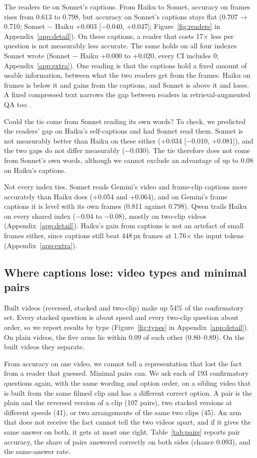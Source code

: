 \documentclass[11pt]{article}
\begin{document}
The readers tie on Sonnet's captions. From Haiku to Sonnet, accuracy on frames rises from 0.613 to 0.798, but accuracy on Sonnet's captions stays flat (0.707 → 0.710; Sonnet − Haiku +0.003 [−0.040, +0.047]; Figure~\ref{fig:readers} in Appendix~\ref{app:detail}). On these captions, a reader that costs 17× less per question is not measurably less accurate. The same holds on all four indexes Sonnet wrote (Sonnet − Haiku +0.000 to +0.020, every CI includes 0; Appendix~\ref{app:extra}). One reading is that the captions hold a fixed amount of usable information, between what the two readers get from the frames. Haiku on frames is below it and gains from the captions, and Sonnet is above it and loses. A fixed compressed text narrows the gap between readers in retrieval-augmented QA too \citep{compressneutral}.

Could the tie come from Sonnet reading its own words? To check, we predicted the readers' gap on Haiku's self-captions and had Sonnet read them. Sonnet is not measurably better than Haiku on these either (+0.034 [−0.010, +0.081]), and the two gaps do not differ measurably (−0.030). The tie therefore does not come from Sonnet's own words, although we cannot exclude an advantage of up to 0.08 on Haiku's captions.

Not every index ties. Sonnet reads Gemini's video and frame-clip captions more accurately than Haiku does (+0.054 and +0.064), and on Gemini's frame captions it is level with its own frames (0.811 against 0.798). Qwen trails Haiku on every shared index (−0.04 to −0.08), mostly on two-clip videos (Appendix~\ref{app:detail}). Haiku's gain from captions is not an artefact of small frames either, since captions still beat 448\,px frames at 1.76× the input tokens (Appendix~\ref{app:extra}).

\subsection{Where captions lose: video types and minimal pairs}
\label{sec:types}

Built videos (reversed, stacked and two-clip) make up 54\% of the confirmatory set. Every stacked question is about speed and every two-clip question about order, so we report results by type (Figure~\ref{fig:types} in Appendix~\ref{app:detail}). On plain videos, the five arms lie within 0.09 of each other (0.80--0.89). On the built videos they separate.

From accuracy on one video, we cannot tell a representation that lost the fact from a reader that guessed. Minimal pairs can. We ask each of 193 confirmatory questions again, with the same wording and option order, on a sibling video that is built from the same filmed clip and has a different correct option. A pair is the plain and the reversed version of a clip (107 pairs), two stacked versions at different speeds (41), or two arrangements of the same two clips (45). An arm that does not receive the fact cannot tell the two videos apart, and if it gives the same answer on both, it gets at most one right. Table~\ref{tab:pairs} reports pair accuracy, the share of pairs answered correctly on both sides (chance 0.093), and the same-answer rate.
\end{document}
